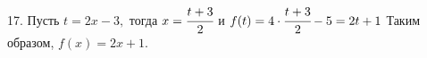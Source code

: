 17. Пусть $t=2x-3,$ тогда $x=\cfrac{t+3}{2}$ и $f(t)=4\cdot\cfrac{t+3}{2}-5=2t+1$ Таким образом, $f(x)=2x+1.$\\

